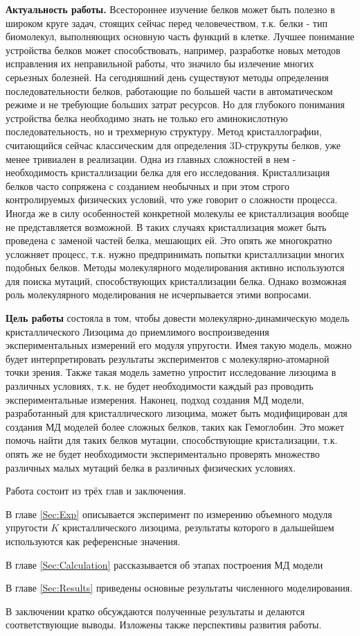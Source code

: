 \intro

\textbf{Актуальность работы.} Всестороннее изучение белков может быть полезно в широком круге задач, стоящих сейчас перед человечеством, т.к. белки - тип биомолекул, выполняющих основную часть функций в клетке. Лучшее понимание устройства белков может способствовать, например, разработке новых методов исправления их неправильной работы, что значило бы излечение многих серьезных болезней. На сегодняшний день существуют методы определения последовательности белков, работающие по большей части в автоматическом режиме и не требующие больших затрат ресурсов. Но для глубокого понимания устройства белка необходимо знать не только его аминокислотную последовательность, но и трехмерную структуру. Метод кристаллографии, считающийся сейчас классическим для определения 3D-струкруты белков, уже менее тривиален в реализации. Одна из главных сложностей в нем - необходимость кристаллизации белка для его исследования. Кристаллизация белков часто сопряжена с созданием необычных и при этом строго контролируемых физических условий, что уже говорит о сложности процесса. Иногда же в силу особенностей конкретной молекулы ее кристаллизация вообще не представляется возможной. В таких случаях кристаллизация может быть проведена с заменой частей белка, мешающих ей. Это опять же многократно усложняет процесс, т.к. нужно предпринимать попытки кристаллизации многих подобных белков. Методы молекулярного моделирования активно используются для поиска мутаций, способствующих кристаллизации белка. Однако возможная роль молекулярного моделирования не исчерпывается этими вопросами.

\textbf{Цель работы} состояла в том, чтобы довести молекулярно-динамическую модель кристаллического Лизоцима до приемлимого воспроизведения экспериментальных измерений его модуля упругости. Имея такую модель, можно будет интерпретировать результаты экспериментов с молекулярно-атомарной точки зрения. Также такая модель заметно упростит исследование лизоцима в различных условиях, т.к. не будет необходимости каждый раз проводить экспериментальные измерения. Наконец, подход создания МД модели, разработанный для кристаллического лизоцима, может быть модифицирован для создания МД моделей более сложных белков, таких как Гемоглобин. Это может помочь найти для таких белков мутации, способствующие кристализации, т.к. опять же не будет необходимости экспериментально проверять множество различных малых мутаций белка в различных физических условиях.

Работа состоит из трёх глав и заключения.

В главе \ref{Sec:Exp} описывается эксперимент по измерению объемного модуля упругости $K$ кристаллического лизоцима, результаты которого в дальшейшем используются как референсные значения.

В главе \ref{Sec:Calculation} рассказывается об этапах построения МД модели

В главе \ref{Sec:Results} приведены основные результаты численного моделирования.

В заключении кратко обсуждаются полученные результаты и делаются соответствующие выводы. Изложены также перспективы развития работы.
